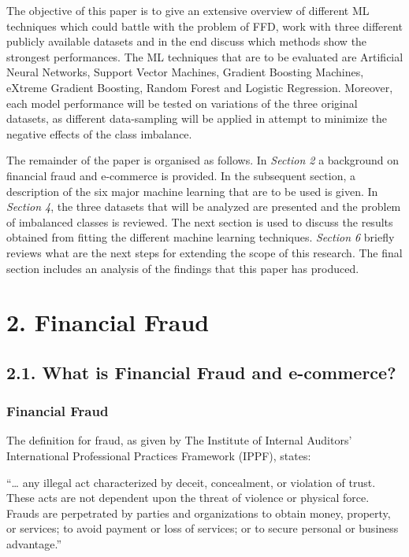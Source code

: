 \documentclass[12pt,]{article}
\begin{document}
The objective of this paper is to give an extensive overview of
different ML techniques which could battle with the problem of FFD, work
with three different publicly available datasets and in the end discuss
which methods show the strongest performances. The ML techniques that
are to be evaluated are Artificial Neural Networks, Support Vector
Machines, Gradient Boosting Machines, eXtreme Gradient Boosting, Random
Forest and Logistic Regression. Moreover, each model performance will be
tested on variations of the three original datasets, as different
data-sampling will be applied in attempt to minimize the negative
effects of the class imbalance.

The remainder of the paper is organised as follows. In \emph{Section 2}
a background on financial fraud and e-commerce is provided. In the
subsequent section, a description of the six major machine learning that
are to be used is given. In \emph{Section 4}, the three datasets that
will be analyzed are presented and the problem of imbalanced classes is
reviewed. The next section is used to discuss the results obtained from
fitting the different machine learning techniques. \emph{Section 6}
briefly reviews what are the next steps for extending the scope of this
research. The final section includes an analysis of the findings that
this paper has produced.

\hypertarget{financial-fraud}{%
\section{2. Financial Fraud}\label{financial-fraud}}

\hypertarget{what-is-financial-fraud-and-e-commerce}{%
\subsection{2.1. What is Financial Fraud and
e-commerce?}\label{what-is-financial-fraud-and-e-commerce}}

\hypertarget{financial-fraud-1}{%
\subsubsection{Financial Fraud}\label{financial-fraud-1}}

The definition for fraud, as given by The Institute of Internal
Auditors' International Professional Practices Framework (IPPF), states:

``\ldots{} any illegal act characterized by deceit, concealment, or
violation of trust. These acts are not dependent upon the threat of
violence or physical force. Frauds are perpetrated by parties and
organizations to obtain money, property, or services; to avoid payment
or loss of services; or to secure personal or business advantage.''
\end{document}
